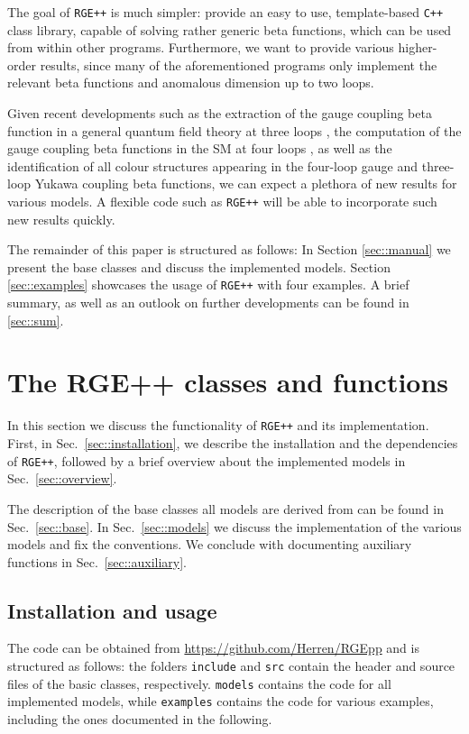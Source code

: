 \documentclass[11pt,a4paper]{article}
\begin{document}
The goal of \texttt{RGE++} is much simpler: provide an easy to use, template-based \texttt{C++} class library, capable of solving rather generic
beta functions, which can be used from within other programs. Furthermore, we want to provide various higher-order results, since many of
the aforementioned programs only implement the relevant beta functions and anomalous dimension up to two loops. 

Given recent developments
such as the extraction of the gauge coupling beta function in a general quantum field theory at three loops \cite{Poole:2019txl,Poole:2019kcm}, the computation
of the gauge coupling beta functions in the SM at four loops \cite{Davies:2019onf}, as well as the identification of all colour structures appearing in the four-loop
gauge and three-loop Yukawa coupling beta functions, we can expect a plethora of new results for various models. A flexible code such as \texttt{RGE++}
will be able to incorporate such new results quickly.

The remainder of this paper is structured as follows: In Section \ref{sec::manual} we present the base classes and discuss the implemented models.
Section \ref{sec::examples} showcases the usage of \texttt{RGE++} with four examples.
A brief summary, as well as an outlook on further developments can be found in \ref{sec::sum}.


\section{\label{sec::manual}The RGE++ classes and functions}
In this section we discuss the functionality of \texttt{RGE++} and its implementation. First, in Sec.~\ref{sec::installation}, we describe the installation and the dependencies of \texttt{RGE++},
followed by a brief overview about the implemented models in Sec.~\ref{sec::overview}.

The description of the base classes all models are derived from can be found in Sec.~\ref{sec::base}. In Sec.~\ref{sec::models} we discuss the implementation of the various models
and fix the conventions. We conclude with documenting auxiliary functions in Sec.~\ref{sec::auxiliary}.

\subsection{\label{sec::installation}Installation and usage}
The code can be obtained from \url{https://github.com/Herren/RGEpp} and is structured as follows: the folders \texttt{include} and \texttt{src} contain the header and source files of the basic classes, respectively.
\texttt{models} contains the code for all implemented models, while \texttt{examples} contains the code for various examples, including the ones documented in the following.
\end{document}
